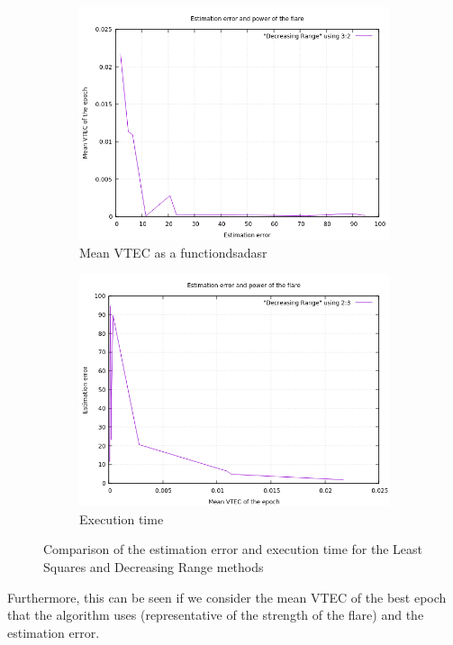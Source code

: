 \begin{figure}[!htb]
\begin{subfigure}[b]{0.5\textwidth}
		\includegraphics[width=\linewidth]{images/results/errorVSmeanVTEC.png}
		\caption{Mean VTEC as a functiondsadasr}
	\end{subfigure}
	\hfill
	\begin{subfigure}[b]{0.5\textwidth}
		\includegraphics[width=\linewidth]{images/results/meanVTECVSerror.png}
		\caption{Execution time}
	\end{subfigure}
	\caption{Comparison of the estimation error and execution time for the Least Squares and Decreasing Range methods}
	\label{fig:comparisonDRLS}
\end{figure}

Furthermore, this can be seen if we consider the mean VTEC of the best epoch that the algorithm uses (representative of the strength of the flare) and the estimation error.

